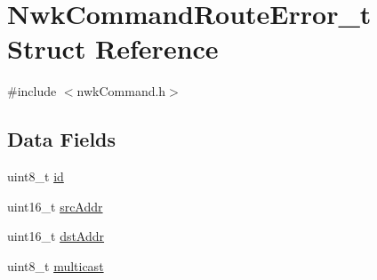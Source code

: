 \hypertarget{struct_nwk_command_route_error__t}{\section{Nwk\-Command\-Route\-Error\-\_\-t Struct Reference}
\label{struct_nwk_command_route_error__t}
}


{\ttfamily \#include $<$nwk\-Command.\-h$>$}

\subsection*{Data Fields}
\begin{DoxyCompactItemize}
\item 
uint8\-\_\-t \hyperlink{struct_nwk_command_route_error__t_afe68500e423cbc2f17ebb51a19303fc8}{id}
\item 
uint16\-\_\-t \hyperlink{struct_nwk_command_route_error__t_a806f760a691cc29aa54ad72a048a97f3}{src\-Addr}
\item 
uint16\-\_\-t \hyperlink{struct_nwk_command_route_error__t_aaa294eee1e346a66b8f85b8578d0504b}{dst\-Addr}
\item 
uint8\-\_\-t \hyperlink{struct_nwk_command_route_error__t_a709e4570410b7104c0acec52189d7302}{multicast}
\end{DoxyCompactItemize}


